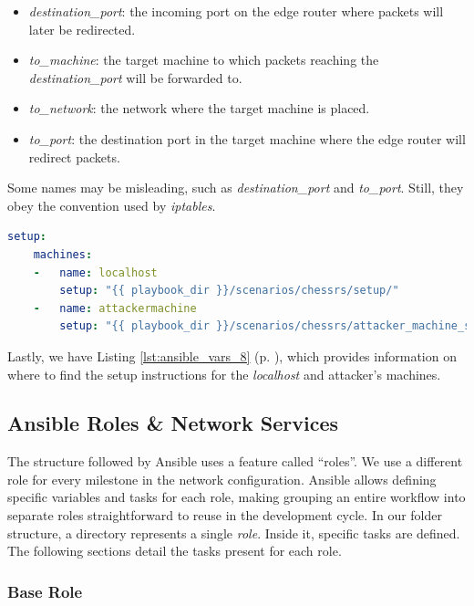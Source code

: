 \begin{itemize}
    \item \textit{destination\_port}: the incoming port on the edge router where packets will later be redirected.
    \item \textit{to\_machine}: the target machine to which packets reaching the \textit{destination\_port} will be forwarded to.
    \item \textit{to\_network}: the network where the target machine is placed.
    \item \textit{to\_port}: the destination port in the target machine where the edge router will redirect packets.
\end{itemize}

Some names may be misleading, such as \textit{destination\_port} and \textit{to\_port}. Still, they obey the convention used by \textit{iptables}.

\begin{lstlisting}[language=yaml,caption=Ansible Variables - Setup Section.,numbers=none,label={lst:ansible_vars_8}]
setup:
    machines:
    -   name: localhost
        setup: "{{ playbook_dir }}/scenarios/chessrs/setup/"
    -   name: attackermachine
        setup: "{{ playbook_dir }}/scenarios/chessrs/attacker_machine_setup/*.j2"
\end{lstlisting}

Lastly, we have Listing \ref{lst:ansible_vars_8} (p. \pageref{lst:ansible_vars_8}), which provides information on where to find the setup instructions for the \textit{localhost} and attacker's machines.

\subsection{Ansible Roles \& Network Services} \label{sec:ansible_roles}

The structure followed by Ansible uses a feature called ``roles''. We use a different role for every milestone in the network configuration. Ansible allows defining specific variables and tasks for each role, making grouping an entire workflow into separate roles straightforward to reuse in the development cycle. In our folder structure, a directory represents a single \textit{role}. Inside it, specific tasks are defined. The following sections detail the tasks present for each role. 

\subsubsection{Base Role} \label{sec:ansible_base_role}


